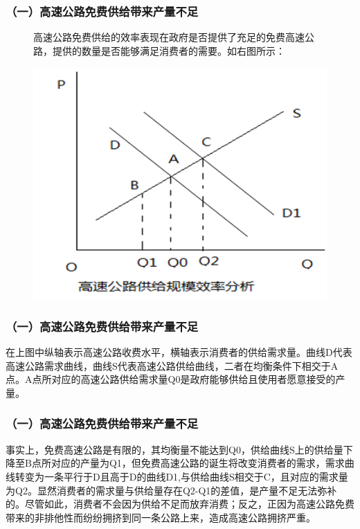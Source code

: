 \documentclass[aspectratio=169, 12pt]{beamer}
\begin{document}
\begin{frame}[plain]
    \frametitle{（一）高速公路免费供给带来产量不足}
    \begin{figure}[]
        \centering
        \begin{minipage}{0.4\linewidth}
            高速公路免费供给的效率表现在政府是否提供了充足的免费高速公路，提供的数量是否能够满足消费者的需要。如右图所示：
        \end{minipage}%
        \begin{minipage}{0.6\linewidth}
            \centering
            \includegraphics[width=1.0\textwidth]{./resources/figure/supply.png}
        \end{minipage}
        \end{figure}
\end{frame}

\begin{frame}[plain]
    \frametitle{（一）高速公路免费供给带来产量不足}
    在上图中纵轴表示高速公路收费水平，横轴表示消费者的供给需求量。曲线D代表高速公路需求曲线，曲线S代表高速公路供给曲线，二者在均衡条件下相交于A点。A点所对应的高速公路供给需求量Q0是政府能够供给且使用者愿意接受的产量。
\end{frame}

\begin{frame}[plain]
    \frametitle{（一）高速公路免费供给带来产量不足}
    事实上，免费高速公路是有限的，其均衡量不能达到Q0，供给曲线S上的供给量下降至B点所对应的产量为Q1，但免费高速公路的诞生将改变消费者的需求，需求曲线转变为一条平行于D且高于D的曲线D1,与供给曲线S相交于C，且对应的需求量为Q2。显然消费者的需求量与供给量存在Q2-Q1的差值，是产量不足无法弥补的。尽管如此，消费者不会因为供给不足而放弃消费；反之，正因为高速公路免费带来的非排他性而纷纷拥挤到同一条公路上来，造成高速公路拥挤严重。
\end{frame}
\end{document}
